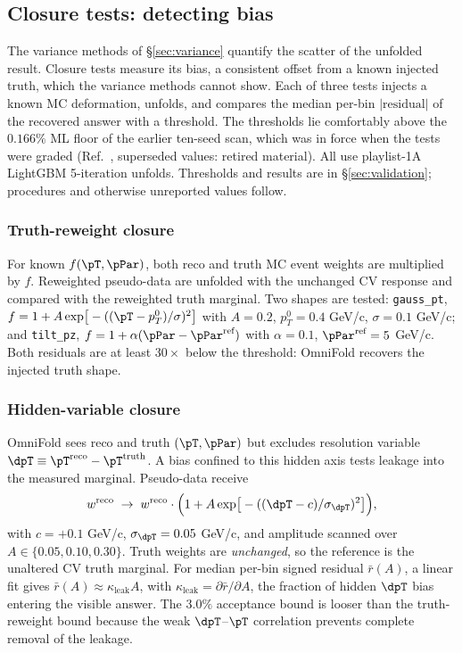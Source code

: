 \subsection{Closure tests: detecting bias}
\label{sec:closure}

The variance methods of \S\ref{sec:variance} quantify the scatter of the unfolded result. Closure tests measure its bias, a consistent offset from a known injected truth, which the variance methods cannot show. Each of three tests injects a known MC deformation, unfolds, and compares the median per-bin $|\text{residual}|$ of the recovered answer with a threshold. The thresholds lie comfortably above the $0.166\%$ ML floor of the earlier ten-seed scan, which was in force when the tests were graded (Ref.~\cite{NoteRecords2026}, superseded values: retired material). All use playlist-1A LightGBM 5-iteration unfolds. Thresholds and results are in \S\ref{sec:validation}; procedures and otherwise unreported values follow.

\subsubsection{Truth-reweight closure}
\label{sec:closure-tr}
For known $f(\pT,\pPar)$, both reco and truth MC event weights are multiplied by $f$. Reweighted pseudo-data are unfolded with the unchanged CV response and compared with the reweighted truth marginal. Two shapes are tested: \texttt{gauss\_pt}, $f = 1 + A\exp\!\big[-((\pT - p_{T}^{0})/\sigma)^{2}\big]$ with $A=0.2$, $p_{T}^{0}=0.4$ GeV/c, $\sigma=0.1$ GeV/c; and \texttt{tilt\_pz}, $f = 1 + \alpha(\pPar - \pPar^{\text{ref}})$ with $\alpha=0.1$, $\pPar^{\text{ref}}=5$ GeV/c. Both residuals are at least $30\times$ below the threshold: OmniFold recovers the injected truth shape.

\subsubsection{Hidden-variable closure}
\label{sec:closure-hv}
OmniFold sees reco and truth $(\pT,\pPar)$ but excludes resolution variable $\dpT \equiv \pT^{\text{reco}}-\pT^{\text{truth}}$. A bias confined to this hidden axis tests leakage into the measured marginal. Pseudo-data receive
\begin{equation}
w^{\text{reco}}
\;\to\;
w^{\text{reco}}\cdot
\Big(1 + A\exp\!\big[-((\dpT - c)/\sigma_{\dpT})^{2}\big]\Big),
\end{equation}
with $c=+0.1$ GeV/c, $\sigma_{\dpT}=0.05$ GeV/c, and amplitude scanned over $A\in\{0.05,0.10,0.30\}$. Truth weights are \emph{unchanged}, so the reference is the unaltered CV truth marginal. For median per-bin signed residual $\bar r(A)$, a linear fit gives $\bar r(A) \approx \kappa_{\text{leak}} A$, with $\kappa_{\text{leak}} = \partial \bar r/\partial A$, the fraction of hidden $\dpT$ bias entering the visible answer. The $3.0\%$ acceptance bound is looser than the truth-reweight bound because the weak $\dpT$--$\pT$ correlation prevents complete removal of the leakage.

